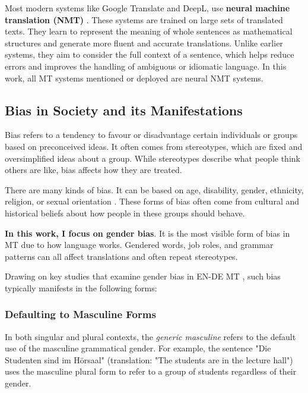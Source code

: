     Most modern systems like Google Translate and DeepL, use \textbf{neural machine translation (NMT)} \citep{wuGooglesNeuralMachine2016,deeplHowDoesDeepL2021}. These systems are trained on large sets of translated texts. They learn to represent the meaning of whole sentences as mathematical structures and generate more fluent and accurate translations. Unlike earlier systems, they aim to consider the full context of a sentence, which helps reduce errors and improves the handling of ambiguous or idiomatic language. In this work, all MT systems mentioned or deployed are neural NMT systems.

\subsection{Bias in Society and its Manifestations}
\label{subsection:manifestations_of_gb}
    Bias refers to a tendency to favour or disadvantage certain individuals or groups based on preconceived ideas. It often comes from stereotypes, which are fixed and oversimplified ideas about a group. While stereotypes describe what people think others are like, bias affects how they are treated.

    There are many kinds of bias. It can be based on age, disability, gender, ethnicity, religion, or sexual orientation \citep{ullmannGenderBiasMachine2022}. These forms of bias often come from cultural and historical beliefs about how people in these groups should behave. 

    \textbf{In this work, I focus on gender bias}. It is the most visible form of bias in MT due to how language works. Gendered words, job roles, and grammar patterns can all affect translations and often repeat stereotypes. 
    
    Drawing on key studies that examine gender bias in EN-DE MT \citep{ullmannGenderBiasMachine2022,rescignoGenderBiasMachine2023,lardelliBuildingBridgesDataset2024,kapplAreAllSpanish2025}, such bias typically manifests in the following forms:

    \subsubsection{Defaulting to Masculine Forms}
        In both singular and plural contexts, the \textit{generic masculine} refers to the default use of the masculine grammatical gender.
        For example, the sentence "Die Studenten sind im Hörsaal" (translation: "The students are in the lecture hall") uses the masculine plural form to refer to a group of students regardless of their gender.

